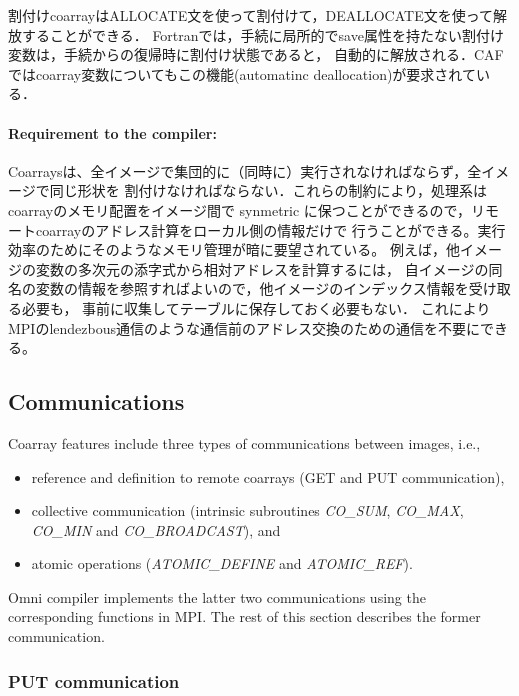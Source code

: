 割付けcoarrayはALLOCATE文を使って割付けて，DEALLOCATE文を使って解放することができる．
Fortranでは，手続に局所的でsave属性を持たない割付け変数は，手続からの復帰時に割付け状態であると，
自動的に解放される．CAFではcoarray変数についてもこの機能(automatinc deallocation)が要求されている．

\paragraph{Requirement to the compiler:}
Coarraysは、全イメージで集団的に（同時に）実行されなければならず，全イメージで同じ形状を
割付けなければならない．これらの制約により，処理系はcoarrayのメモリ配置をイメージ間で
synmetric に保つことができるので，リモートcoarrayのアドレス計算をローカル側の情報だけで
行うことができる。実行効率のためにそのようなメモリ管理が暗に要望されている。
例えば，他イメージの変数の多次元の添字式から相対アドレスを計算するには，
自イメージの同名の変数の情報を参照すればよいので，他イメージのインデックス情報を受け取る必要も，
事前に収集してテーブルに保存しておく必要もない．
これによりMPIのlendezbous通信のような通信前のアドレス交換のための通信を不要にできる。


\subsection{Communications}

Coarray features include three types of communications between images, i.e.,
\begin{itemize}
\item reference and definition to remote coarrays (GET and PUT communication),
\item collective communication (intrinsic subroutines {\em CO\_SUM}, {\em CO\_MAX}, 
{\em CO\_MIN} and {\em CO\_BROADCAST}), and
\item atomic operations ({\em ATOMIC\_DEFINE} and {\em ATOMIC\_REF}).
\end{itemize}

Omni compiler implements the latter two communications using the corresponding 
functions in MPI. The rest of this section describes the former communication.

\subsubsection{PUT communication}

